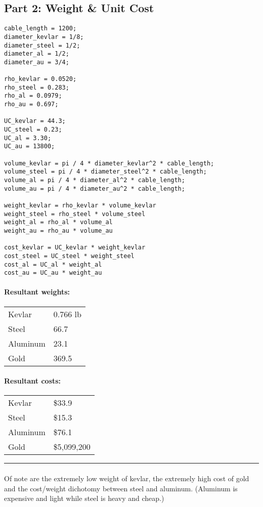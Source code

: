 \documentclass[paper=a4, fontsize=12pt]{scrartcl} %
\newcommand{\HRule}{\rule{\linewidth}{0.5mm}}
\numberwithin{equation}{section} %
\numberwithin{figure}{section} %
\numberwithin{table}{section} %
\begin{document}
\subsection*{Part 2: Weight \& Unit Cost}
\begin{lstlisting}[caption=Volume Weight \& Cost Calculations]
cable_length = 1200;
diameter_kevlar = 1/8;
diameter_steel = 1/2;
diameter_al = 1/2;
diameter_au = 3/4;

rho_kevlar = 0.0520;
rho_steel = 0.283;
rho_al = 0.0979;
rho_au = 0.697;

UC_kevlar = 44.3;
UC_steel = 0.23;
UC_al = 3.30;
UC_au = 13800;

volume_kevlar = pi / 4 * diameter_kevlar^2 * cable_length;
volume_steel = pi / 4 * diameter_steel^2 * cable_length;
volume_al = pi / 4 * diameter_al^2 * cable_length;
volume_au = pi / 4 * diameter_au^2 * cable_length;

weight_kevlar = rho_kevlar * volume_kevlar
weight_steel = rho_steel * volume_steel
weight_al = rho_al * volume_al
weight_au = rho_au * volume_au

cost_kevlar = UC_kevlar * weight_kevlar
cost_steel = UC_steel * weight_steel
cost_al = UC_al * weight_al
cost_au = UC_au * weight_au
\end{lstlisting}

\paragraph{Resultant weights:} 
\begin{tabularx}{250px}{X X}
\hline
Kevlar & 0.766 lb \\
Steel & 66.7 \\
Aluminum & 23.1 \\
Gold & 369.5 \\
\end{tabularx}

\paragraph{Resultant costs:}
\begin{tabularx}{250px}{X X}
\hline
Kevlar & \$33.9 \\
Steel & \$15.3 \\
Aluminum & \$76.1 \\
Gold & \$5,099,200 \\
\end{tabularx}

\HRule
\paragraph{} Of note are the extremely low weight of kevlar, the extremely high cost of gold and the cost/weight dichotomy between steel and aluminum. (Aluminum is expensive and light while steel is heavy and cheap.)
\end{document}
